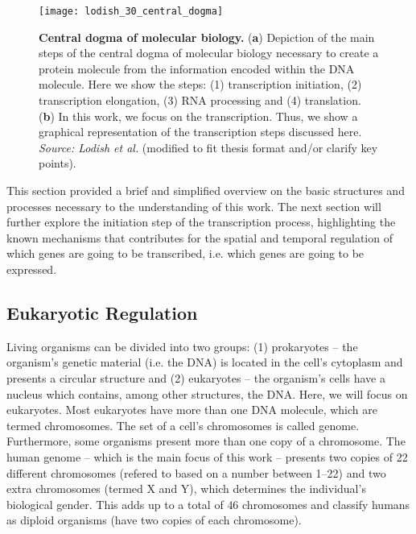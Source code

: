 \begin{figure}[h!]
\centering
\texttt{[image: lodish\_30\_central\_dogma]}
\caption[Central dogma of molecular biology]{\textbf{Central dogma of molecular biology.} (\textbf{a}) Depiction of the main steps of the central dogma of molecular biology necessary to create a protein molecule from the information encoded within the DNA molecule. Here we show the steps: (1) transcription initiation, (2) transcription elongation, (3) RNA processing and (4) translation. (\textbf{b}) In this work, we focus on the transcription. Thus, we show a graphical representation of the transcription steps discussed here. \emph{Source: Lodish et al.}\cite{lodish2007} (modified to fit thesis format and/or clarify key points).}
\label{fig:lodish_central_dogma}
\end{figure}

This section provided a brief and simplified overview on the basic structures and processes necessary to the understanding of this work. The next section will further explore the initiation step of the transcription process, highlighting the known mechanisms that contributes for the spatial and temporal regulation of which genes are going to be transcribed, i.e. which genes are going to be expressed.

\subsection{Eukaryotic Regulation}
\label{sec:eukaryotic.regulation}

Living organisms can be divided into two groups: (1) prokaryotes -- the organism's genetic material (i.e. the DNA) is located in the cell's cytoplasm and presents a circular structure and (2) eukaryotes -- the organism's cells have a nucleus which contains, among other structures, the DNA. Here, we will focus on eukaryotes. Most eukaryotes have more than one DNA molecule, which are termed chromosomes. The set of a cell's chromosomes is called genome. Furthermore, some organisms present more than one copy of a chromosome. The human genome -- which is the main focus of this work -- presents two copies of 22 different chromosomes (refered to based on a number between 1--22) and two extra chromosomes (termed X and Y), which determines the individual's biological gender. This adds up to a total of $46$ chromosomes and classify humans as diploid organisms (have two copies of each chromosome).

